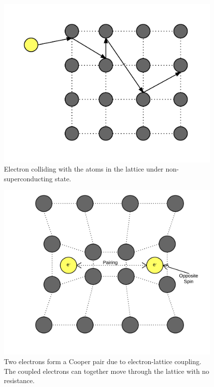 \documentclass[prb,preprint]{revtex4-1}
\begin{document}
\begin{figure}[h]
\centering
\includegraphics[width=\textwidth]{phonon.png}
\caption{Electron colliding with the atoms in the lattice under non-superconducting state.}
\label{phonon}
\end{figure}

\begin{figure}[h]
\centering
\includegraphics[width=\textwidth]{superconducting.png}
\caption{Two electrons form a Cooper pair due to electron-lattice coupling. The coupled electrons can together move through the lattice with no resistance.}
\label{superconducting}
\end{figure}
\end{document}
